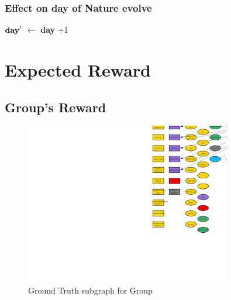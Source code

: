 \documentclass{article}%
\begin{document}
%
\subsubsection{Effect on day of Nature evolve}%
\label{ssubsec:Effect on day of Nature evolve}%
\begin{flushleft}%
$\mbox{\textbf{day}} '$%
$\leftarrow$%
\textbf{day}%
+1%
\end{flushleft}

%
\section{Expected Reward}%
\label{sec:Expected Reward}%
\subsection{Group's Reward}%
\label{subsec:Group's Reward}%


\begin{figure}[ht]%
\centering%
\includegraphics[width=0.8\textwidth]{images/Group.png}%
\caption{Ground Truth subgraph for Group}%
\end{figure}
\end{document}

